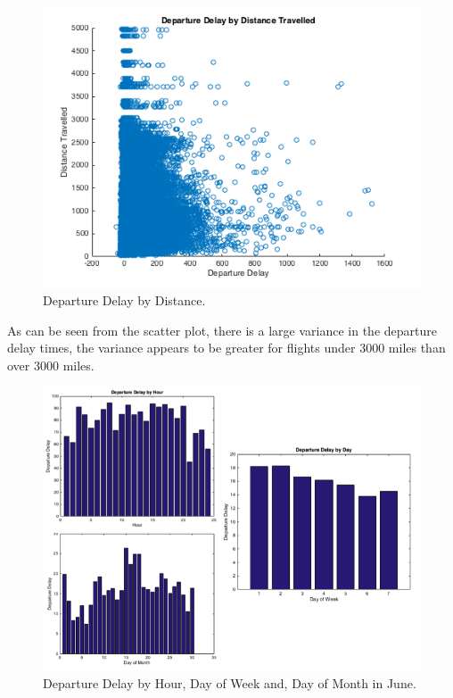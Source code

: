 \documentclass[a4paper, 11pt]{article}
\begin{document}
\begin{figure}[H]
\begin{center}
\includegraphics[scale=0.5]{departureDelayByDistanceTravelled}
\caption{Departure Delay by Distance.}
\label{departureDelayByDistanceTravelled}
\end{center}
\end{figure}

As can be seen from the scatter plot, there is a large variance in the departure delay times, the variance appears to be greater for flights under 3000 miles than over 3000 miles. 

\begin{figure}[H]
\begin{center}
\includegraphics[scale=0.5]{explore}
\caption{Departure Delay by Hour, Day of Week and, Day of Month in June.}
\label{explore}
\end{center}
\end{figure}
\end{document}
